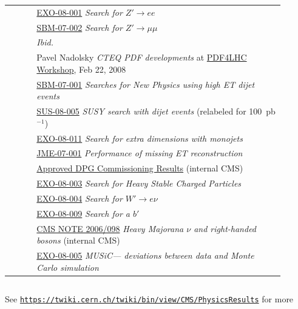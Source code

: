 \documentclass[compress]{beamer}
\begin{document}
\begin{frame}
\begin{columns}
\begin{tabular}{c p{0.9\linewidth}}
\pageref{dielectrons_dimuons} & \textcolor{blue}{\href{http://cms-physics.web.cern.ch/cms-physics/public/EXO-08-001-pas.pdf}{EXO-08-001}} {\it Search for $Z' \to ee$} \\
 & \textcolor{blue}{\href{http://cms-physics.web.cern.ch/cms-physics/public/SBM-07-002-pas.pdf}{SBM-07-002}} {\it Search for $Z' \to \mu\mu$} \\
\pageref{diobject_reach} & {\it Ibid.} \\
 & Pavel Nadolsky {\it CTEQ PDF developments} at \textcolor{blue}{\href{indico.cern.ch/conferenceDisplay.py?confId=27439}{PDF4LHC Workshop}}, Feb 22, 2008 \\
\pageref{dijets} & \textcolor{blue}{\href{http://cms-physics.web.cern.ch/cms-physics/public/SBM-07-001-pas.pdf}{SBM-07-001}} {\it Searches for New Physics using high ET dijet events} \\
 & \textcolor{blue}{\href{http://cms-physics.web.cern.ch/cms-physics/public/SUS-08-005-pas.pdf}{SUS-08-005}} {\it SUSY search with dijet events} (relabeled for 100~pb$^{-1}$) \\
\pageref{onejet_onemet} & \textcolor{blue}{\href{http://cms-physics.web.cern.ch/cms-physics/public/EXO-08-011-pas.pdf}{EXO-08-011}} {\it Search for extra dimensions with monojets} \\
\pageref{missing_energy} & \textcolor{blue}{\href{http://cms-physics.web.cern.ch/cms-physics/public/JME-07-001-pas.pdf}{JME-07-001}} {\it Performance of missing ET reconstruction} \\
 & \textcolor{blue}{\href{http://indico.cern.ch/conferenceDisplay.py?confId=43093}{Approved DPG Commissioning Results}} (internal CMS) \\
\pageref{champs} & \textcolor{blue}{\href{http://cms-physics.web.cern.ch/cms-physics/public/EXO-08-003-pas.pdf}{EXO-08-003}} {\it Search for Heavy Stable Charged Particles} \\
\pageref{others} & \textcolor{blue}{\href{http://cms-physics.web.cern.ch/cms-physics/public/EXO-08-004-pas.pdf}{EXO-08-004}} {\it Search for $W' \to e\nu$} \\
 & \textcolor{blue}{\href{http://cms-physics.web.cern.ch/cms-physics/public/EXO-08-009-pas.pdf}{EXO-08-009}} {\it Search for a $b'$} \\
 & \textcolor{blue}{\href{http://mkirsano.web.cern.ch/mkirsano/cmsanalysis/heavynu-cmsnote.pdf}{CMS NOTE 2006/098}} {\it Heavy Majorana $\nu$ and right-handed bosons} (internal CMS) \\
 & \textcolor{blue}{\href{http://cms-physics.web.cern.ch/cms-physics/public/EXO-08-005-pas.pdf}{EXO-08-005}} {\it MUSiC--- deviations between data and Monte Carlo simulation} \\\hline\hline
\end{tabular}
\end{columns}

\vfill
See \textcolor{blue}{\tt \href{https://twiki.cern.ch/twiki/bin/view/CMS/PhysicsResults}{https://twiki.cern.ch/twiki/bin/view/CMS/PhysicsResults}} for more
\end{frame}
\end{document}

